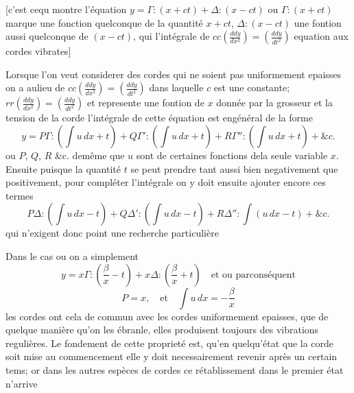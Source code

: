 \documentclass[11pt,a4paper]{article}
\begin{document}
[c'est cequ montre l'équation $y = \Gamma{:}(x+ct) + \Delta{:}(x-ct)$ ou $\Gamma{:}(x+ct)$ marque
une fonction quelconque de la quantité $x+ct$, $\Delta{:}(x-ct)$ une fontion aussi
quelconque de $(x-ct)$, qui l'intégrale de $cc\left(\frac{ddy}{dx^{2}}\right) = \left(\frac{ddy}{dt^{2}}\right)$ equation aux
cordes vibrates]

Lorsque l'on veut considerer des cordes qui ne soient pas uniformement
epaisses on a aulieu de $cc\left(\frac{ddy}{dx^{2}}\right) = \left(\frac{ddy}{dt^{2}}\right)$ dans laquelle $c$ est une
constante; $rr\left(\frac{ddy}{dx^{2}}\right) = \left(\frac{ddy}{dt^{2}}\right)$ et  represente une fontion de $x$ donnée
par la grosseur et la tension de la corde l'intégrale de cette
équation est engénéral de la forme
\[ y = P\Gamma{:}\left(\int u\,dx + t\right) + Q\Gamma'{:}\left(\int u\,dx + t\right) + R\Gamma''{:}\left(\int u\,dx + t\right) + \&c. \]
ou $P$, $Q$, $R$ \&c. demême que $u$ sont de certaines fonctions dela seule
variable $x$. Ensuite puisque la quantité $t$ se peut prendre tant
aussi bien negativement que positivement, pour compléter l'intégrale
on y doit ensuite ajouter encore ces termes
\[ P\Delta{:}\left(\int u\,dx - t\right) + Q\Delta'{:}\left(\int u\,dx - t\right) + R\Delta''{:}\int\left(u\,dx - t\right) + \&c. \]
qui n'exigent donc point une recherche particulière

Dans le cas ou on a simplement
\[ y = x\Gamma{:}\left(\frac{\beta}{x} - t\right) + x\Delta{:}\left(\frac{\beta}{x} + t\right) \quad \text{et ou parconséquent} \]
\[ P = x, \quad \text{et} \quad \int u\,dx = -\frac{\beta}{x} \]
les cordes ont cela de commun avec les cordes uniformement epaisses,
que de quelque manière qu'on les ébranle, elles produisent toujours des
vibrations regulières. Le fondement de cette proprieté est, qu'en
quelqu'état que la corde soit mise au commencement elle y doit
necessairement revenir après un certain tems; or dans les autres
espèces de cordes ce rétablissement dans le premier état n'arrive
\end{document}
